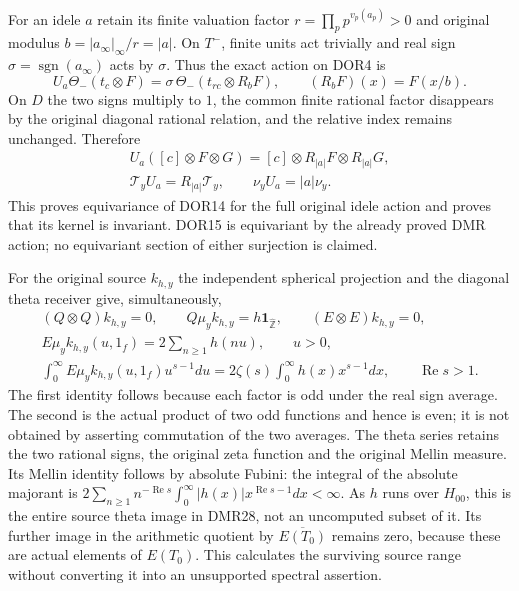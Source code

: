 For an idele $a$ retain its finite valuation factor
$r=\prod_p p^{v_p(a_p)}>0$ and original modulus
$b=|a_\infty|_\infty/r=|a|$. On $T^-$, finite units act trivially
and real sign $\sigma=\operatorname{sgn}(a_\infty)$ acts by
$\sigma$. Thus the exact action on DOR4 is
\[
U_a\Theta_-(t_c\otimes F)
 =\sigma\,\Theta_-(t_{rc}\otimes R_bF),\qquad
(R_bF)(x)=F(x/b).
\]
On $D$ the two signs multiply to $1$, the common finite rational
factor disappears by the original diagonal rational relation, and
the relative index remains unchanged. Therefore
\begin{equation}\tag{DOR17}
\begin{gathered}
U_a([c]\otimes F\otimes G)
 =[c]\otimes R_{|a|}F\otimes R_{|a|}G,\\
\mathcal T_yU_a=R_{|a|}\mathcal T_y,\qquad
\nu_yU_a=|a|\nu_y.
\end{gathered}
\end{equation}
This proves equivariance of DOR14 for the full original idele
action and proves that its kernel is invariant. DOR15 is
equivariant by the already proved DMR action; no equivariant
section of either surjection is claimed.

For the original source $k_{h,y}$ the independent spherical
projection and the diagonal theta receiver give, simultaneously,
\begin{equation}\tag{DOR18}
\begin{gathered}
(Q\otimes Q)k_{h,y}=0,\qquad
Q\mu_yk_{h,y}=h\mathbf1_{\widehat{\mathbb Z}},\qquad
(E\otimes E)k_{h,y}=0,\\
E\mu_yk_{h,y}(u,1_f)=2\sum_{n\ge1}h(nu),\qquad u>0,\\
\int_0^\infty E\mu_yk_{h,y}(u,1_f)u^{s-1}du
 =2\zeta(s)\int_0^\infty h(x)x^{s-1}dx,
\qquad\operatorname{Re}s>1.
\end{gathered}
\end{equation}
The first identity follows because each factor is odd under the
real sign average. The second is the actual product of two odd
functions and hence is even; it is not obtained by asserting
commutation of the two averages. The theta series retains the
two rational signs, the original zeta function and the original
Mellin measure. Its Mellin identity follows by absolute Fubini:
the integral of the absolute majorant is
$2\sum_{n\ge1}n^{-\operatorname{Re}s}
\int_0^\infty|h(x)|x^{\operatorname{Re}s-1}dx<\infty$.
As $h$ runs over $H_{00}$, this is the entire source theta image
in DMR28, not an uncomputed subset of it. Its further image in
the arithmetic quotient by $\overline{E(T_0)}$ remains zero,
because these are actual elements of $E(T_0)$. This calculates
the surviving source range without converting it into an
unsupported spectral assertion.

